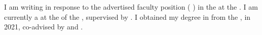 I am writing in response to the advertised faculty position (\textbf{\appPosition{} \appJobID}) in the \appDept{} at the \appSchool{}. I am currently a \myTitle{} at the \myDept{} of the \mySchoolShort{}, supervised by \mySuper{}. I obtained my \myDegree{} degree in \myMajor{} from the \myPhDSchool{}, in 2021, co-advised by \myAdvisor{} and \myCoAdvisor{}.

